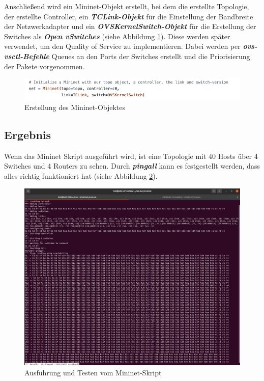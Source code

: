 \documentclass[fontsize=12pt,paper=a4,open=any,parskip=half,
  twoside=false,toc=listof,toc=bibliography,fleqn,leqno,
  captions=nooneline,captions=tableabove,british]{scrbook}
\begin{document}
Anschließend wird ein Mininet-Objekt erstellt, bei dem die erstellte Topologie, der erstellte Controller, ein \textit{\textbf{TCLink-Objekt}} für die Einstellung der Bandbreite der Netzwerkadapter und ein \textit{\textbf{OVSKernelSwitch-Objekt}} für die Erstellung der Switches als \textit{\textbf{Open vSwitches}} (siehe Abbildung \ref{mininet6}). Diese werden später verwendet, um den Quality of Service zu implementieren. Dabei werden per \textit{\textbf{ovs-vsctl-Befehle}} Queues an den Ports der Switches erstellt und die Priorisierung der Pakete vorgenommen.

\begin{figure}[H]
 \centering
 \includegraphics[width=1.0\textwidth]{Bilder/mininet6}
 \captionsetup{justification=centering,margin=1cm}
 \caption{Erstellung des Mininet-Objektes}
 \label{mininet6}
\end{figure}

\subsection{Ergebnis}
Wenn das Mininet Skript ausgeführt wird, ist eine Topologie mit 40 Hosts über 4 Switches und 4 Routers zu sehen. Durch \textit{\textbf{pingall}} kann es festgestellt werden, dass alles richtig funktioniert hat (siehe Abbildung \ref{pingall}).

\begin{figure}[H]
 \centering
 \includegraphics[width=1.0\textwidth]{Bilder/pingall}
 \captionsetup{justification=centering,margin=1cm}
 \caption{Ausführung und Testen vom Mininet-Skript}
 \label{pingall}
\end{figure}
\end{document}
